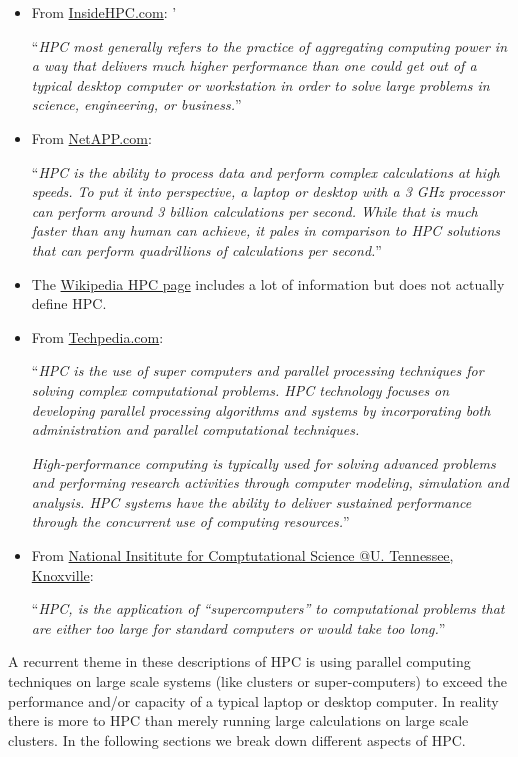 \begin{itemize}
    \item[] From \href{https://insidehpc.com/hpc-basic-training/what-is-hpc/}{InsideHPC.com}: '
    
    ``\emph{HPC most generally refers to the practice of aggregating computing power in a way that delivers much higher performance than one could get out of a typical desktop computer or workstation in order to solve large problems in science, engineering, or business.}''
    \item[] From \href{https://www.netapp.com/us/info/what-is-high-performance-computing.aspx}{NetAPP.com}: 
    
    ``\emph{HPC is the ability to process data and perform complex calculations at high speeds. To put it into perspective, a laptop or desktop with a 3 GHz processor can perform around 3 billion calculations per second. While that is much faster than any human can achieve, it pales in comparison to HPC solutions that can perform quadrillions of calculations per second.}''
    \item[] The \href{https://en.wikipedia.org/wiki/Supercomputer}{Wikipedia HPC page} includes a lot of information but does not actually define HPC.
    \item[] From  \href{https://www.techopedia.com/definition/4595/high-performance-computing-hpc}{Techpedia.com}: 
    
    ``\emph{HPC is the use of super computers and parallel processing techniques for solving complex computational problems. HPC technology focuses on developing parallel processing algorithms and systems by incorporating both administration and parallel computational techniques.}
    
    \emph{High-performance computing is typically used for solving advanced problems and performing research activities through computer modeling, simulation and analysis. HPC systems have the ability to deliver sustained performance through the concurrent use of computing resources.}''
    \item[] From \href{https://www.nics.utk.edu/computing-resources/what-is-hpc}{National Insititute for Comptutational Science @U. Tennessee, Knoxville}:  
    
    ``\emph{HPC, is the application of ``supercomputers'' to computational problems that are either too large for standard computers or would take too long.}''
\end{itemize}
A recurrent theme in these descriptions of HPC is using parallel computing techniques on large scale systems (like clusters or super-computers) to exceed the performance and/or capacity of a typical laptop or desktop computer. In reality there is more to HPC than merely running large calculations on large scale clusters. In the following sections we break down different aspects of HPC.

